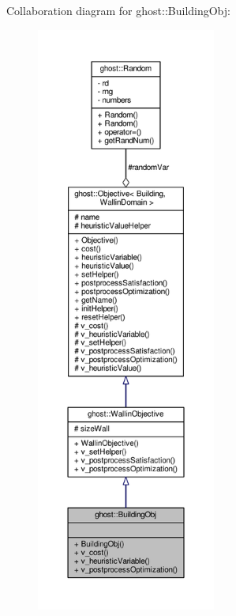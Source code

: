 Collaboration diagram for ghost\-:\-:Building\-Obj\-:
\nopagebreak
\begin{figure}[H]
\begin{center}
\leavevmode
\includegraphics[height=550pt]{classghost_1_1BuildingObj__coll__graph}
\end{center}
\end{figure}
